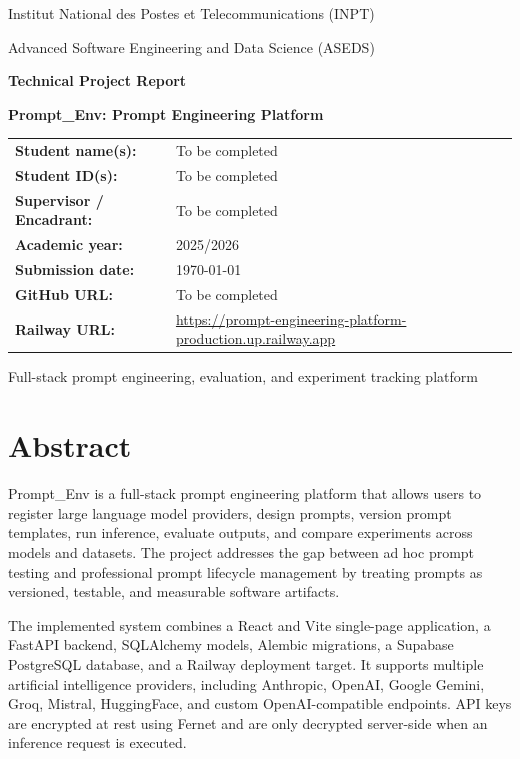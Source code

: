\documentclass[12pt,a4paper]{report}
\newcommand{\ProjectName}{Prompt\_Env}
\newcommand{\StudentName}{To be completed}
\newcommand{\StudentId}{To be completed}
\newcommand{\SupervisorName}{To be completed}
\newcommand{\GitHubUrl}{To be completed}
\newcommand{\RailwayUrl}{https://prompt-engineering-platform-production.up.railway.app}
\begin{document}
\begin{titlepage}
  \centering
  \vspace*{1cm}
  {\Large Institut National des Postes et Telecommunications (INPT)\par}
  \vspace{0.4cm}
  {\large Advanced Software Engineering and Data Science (ASEDS)\par}
  \vspace{1.6cm}
  {\Huge\bfseries Technical Project Report\par}
  \vspace{0.7cm}
  {\LARGE\bfseries \ProjectName: Prompt Engineering Platform\par}
  \vspace{1.5cm}
  \begin{tabular}{>{\bfseries}p{5cm}p{8cm}}
    Student name(s): & \StudentName \\
    Student ID(s): & \StudentId \\
    Supervisor / Encadrant: & \SupervisorName \\
    Academic year: & 2025/2026 \\
    Submission date: & \today \\
    GitHub URL: & \GitHubUrl \\
    Railway URL: & \url{\RailwayUrl} \\
  \end{tabular}
  \vfill
  {\large Full-stack prompt engineering, evaluation, and experiment tracking platform\par}
\end{titlepage}

\chapter*{Abstract}
\ProjectName{} is a full-stack prompt engineering platform that allows users to register large language model providers, design prompts, version prompt templates, run inference, evaluate outputs, and compare experiments across models and datasets. The project addresses the gap between ad hoc prompt testing and professional prompt lifecycle management by treating prompts as versioned, testable, and measurable software artifacts.

The implemented system combines a React and Vite single-page application, a FastAPI backend, SQLAlchemy models, Alembic migrations, a Supabase PostgreSQL database, and a Railway deployment target. It supports multiple artificial intelligence providers, including Anthropic, OpenAI, Google Gemini, Groq, Mistral, HuggingFace, and custom OpenAI-compatible endpoints. API keys are encrypted at rest using Fernet and are only decrypted server-side when an inference request is executed.
\end{document}

